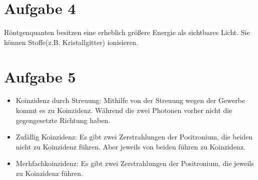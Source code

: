 \section{Aufgabe 4}
Röntgenquanten besitzen eine erheblich größere Energie als sichtbares Licht. Sie können Stoffe(z.B. Kristallgitter) ionisieren.

\section{Aufgabe 5}
\begin{itemize}
    \item Koinzidenz durch Streuung: Mithilfe von der Streuung wegen der Gewerbe kommt es zu Koinzidenz. Während die zwei Photonen vorher nicht die gegengesetzte Richtung haben. 
    \item Zufällig Koinzidenz: Es gibt zwei Zerstrahlungen der Positronium, die beiden nicht zu Koinzidenz führen. Aber jeweils von beiden führen zu Koinzidenz.
    \item Merhfachkoinzidenz: Es gibt zwei Zerstrahlungen der Positronium, die jeweils zu Koinzidenz führen.
\end{itemize}